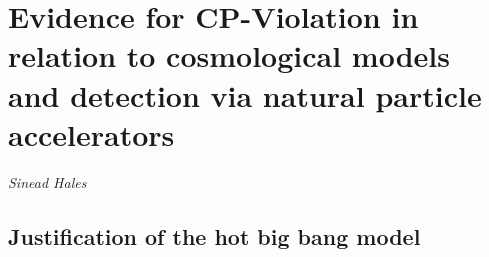 



\section{Evidence for CP-Violation in relation to cosmological models and detection via natural particle accelerators}
\vspace{-1.0em}
\begin{center}
\tiny{\textit{Sinead Hales}}
\end{center}

%

\subsection{Justification of the hot big bang model}

